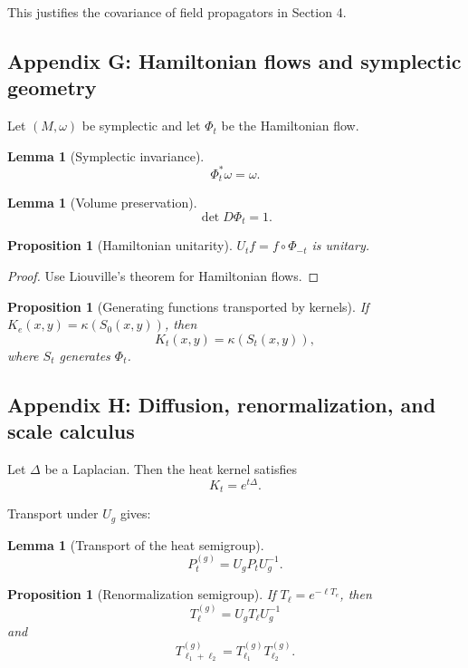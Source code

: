\documentclass[11pt]{article}
\newtheorem{lemma}[theorem]{Lemma}
\newtheorem{proposition}[theorem]{Proposition}
\theoremstyle{definition}
\begin{document}
This justifies the covariance of field propagators in Section 4.

\subsection{Appendix G: Hamiltonian flows and symplectic geometry}

Let $(M,\omega)$ be symplectic and let $\Phi_t$ be the Hamiltonian flow.

\begin{lemma}[Symplectic invariance]
	\[
	\Phi_t^\ast \omega = \omega.
	\]
\end{lemma}

\begin{lemma}[Volume preservation]
	\[
	\det D\Phi_t = 1.
	\]
\end{lemma}

\begin{proposition}[Hamiltonian unitarity]
	$U_t f = f\circ\Phi_{-t}$ is unitary.
\end{proposition}

\begin{proof}
	Use Liouville’s theorem for Hamiltonian flows.
\end{proof}

\begin{proposition}[Generating functions transported by kernels]
	If $K_e(x,y)=\kappa(S_0(x,y))$, then
	\[
	K_t(x,y)=\kappa(S_t(x,y)),
	\]
	where $S_t$ generates $\Phi_t$.
\end{proposition}

\subsection{Appendix H: Diffusion, renormalization, and scale calculus}

Let $\Delta$ be a Laplacian.  
Then the heat kernel satisfies
\[
K_t = e^{t\Delta}.
\]

Transport under $U_g$ gives:

\begin{lemma}[Transport of the heat semigroup]
	\[
	P_t^{(g)} = U_g P_t U_g^{-1}.
	\]
\end{lemma}

\begin{proposition}[Renormalization semigroup]
	If $T_\ell=e^{-\ell T_e}$, then
	\[
	T_\ell^{(g)} = U_g T_\ell U_g^{-1}
	\]
	and
	\[
	T_{\ell_1+\ell_2}^{(g)} = T_{\ell_1}^{(g)} T_{\ell_2}^{(g)}.
	\]
\end{proposition}
\end{document}
